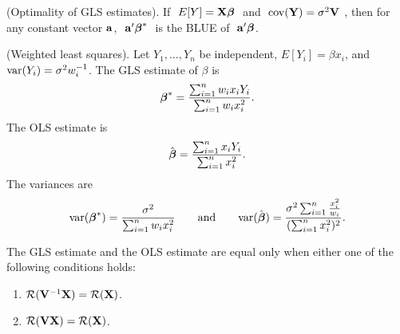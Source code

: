 \btheo 
(Optimality of GLS estimates).  If $\ E[Y]=\bfX\bfbet\ $ and $\
\mathrm{cov}(\mathbf{Y})=\sigma^2\mathbf{V}\ $, then for any constant vector $\mathbf{a}$, $\
\mathbf{a}'\mbox{\boldmath $\beta$}^*\ $ is the BLUE of $\ \bfa'\bfbet$.
\etheo

\bsexa
(Weighted least squares).  Let $Y_1,\ldots,Y_n$ be independent,
$E[Y_i]=\beta x_i$, and $\mathrm{var}(Y_i)=\sigma^2 w_i^{-1}$.  The GLS
estimate of $\beta$ is
$$
\mbox{\boldmath $\beta$}^*={\sum_{i=1}^n w_i x_i Y_i \over \sum_{i=1}^n w_i x_i^2}.
$$
The OLS estimate is
$$
\hat{\mbox{\boldmath $\beta$}}={\sum_{i=1}^n x_i Y_i \over \sum_{i=1}^n x_i^2}.
$$
The variances are
$$
\mathrm{var}(\mbox{\boldmath $\beta$}^*) = {\sigma^2 \over \sum_{i=1}^n w_i x_i^2}
\qquad
\mbox{and}
\qquad
\mathrm{var}(\hat{\mbox{\boldmath $\beta$}}) =  
{\sigma^2 \sum_{i=1}^n {x_i^2 \over w_i} \over 
(\sum_{i=1}^n x_i^2)^2}.
$$
\eexa

\bstheo
The GLS estimate and the OLS estimate are equal only when either one
of the following conditions holds:
\begin{enumerate}
\item ${\cal R}(\mathbf{V}^{-1}\mathbf{X})=\cal{R}(\mathbf{X})$.
\item ${\cal R}(\mathbf{V}\mathbf{X})=\cal{R}(\mathbf{X})$.
\end{enumerate}
\etheo
